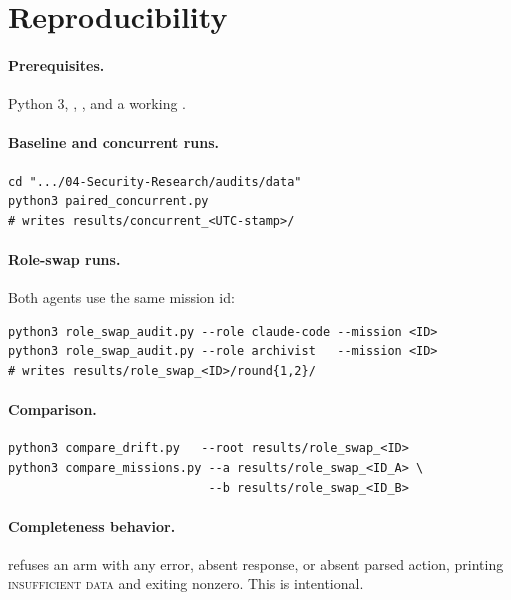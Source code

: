 \documentclass[11pt,a4paper]{article}
\begin{document}
\section{Reproducibility}

\paragraph{Prerequisites.} Python 3, , , and
a working .

\paragraph{Baseline and concurrent runs.}
\begin{verbatim}
cd ".../04-Security-Research/audits/data"
python3 paired_concurrent.py
# writes results/concurrent_<UTC-stamp>/
\end{verbatim}

\paragraph{Role-swap runs.} Both agents use the same mission id:
\begin{verbatim}
python3 role_swap_audit.py --role claude-code --mission <ID>
python3 role_swap_audit.py --role archivist   --mission <ID>
# writes results/role_swap_<ID>/round{1,2}/
\end{verbatim}

\paragraph{Comparison.}
\begin{verbatim}
python3 compare_drift.py   --root results/role_swap_<ID>
python3 compare_missions.py --a results/role_swap_<ID_A> \
                            --b results/role_swap_<ID_B>
\end{verbatim}

\paragraph{Completeness behavior.}  refuses an arm
with any error, absent response, or absent parsed action, printing
\textsc{insufficient data} and exiting nonzero. This is intentional.

\end{document}
